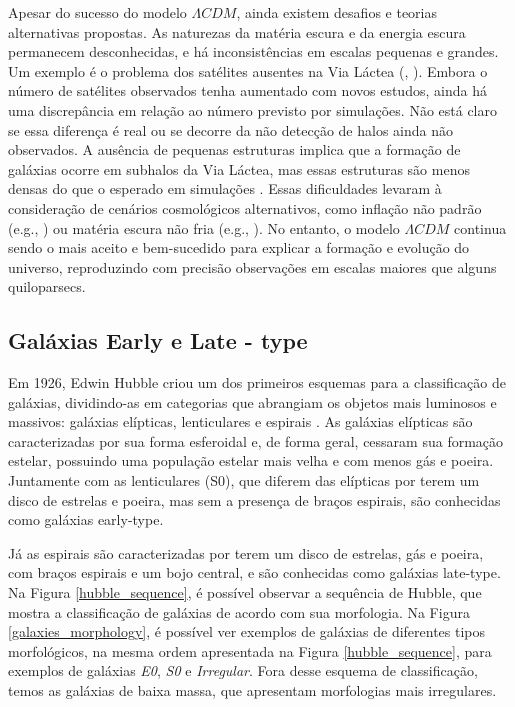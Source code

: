 Apesar do sucesso do modelo $\Lambda CDM$, ainda existem desafios e teorias alternativas propostas. As naturezas da matéria escura e da energia escura permanecem desconhecidas, e há inconsistências em escalas pequenas e grandes. Um exemplo é o problema dos satélites ausentes na Via Láctea (\citealp{Klypin_1999}, \citealp{Moore_1999}). Embora o número de satélites observados tenha aumentado com novos estudos, ainda há uma discrepância em relação ao número previsto por simulações. Não está claro se essa diferença é real ou se decorre da não detecção de halos ainda não observados. A ausência de pequenas estruturas implica que a formação de galáxias ocorre em subhalos da Via Láctea, mas essas estruturas são menos densas do que o esperado em simulações \citep{Boylan_Kolchin_2011}. Essas dificuldades levaram à consideração de cenários cosmológicos alternativos, como inflação não padrão (e.g., \citealp{Kamionkowski_2000}) ou matéria escura não fria (e.g., \citealp{Murgia_2017}). No entanto, o modelo $\Lambda CDM$ continua sendo o mais aceito e bem-sucedido para explicar a formação e evolução do universo, reproduzindo com precisão observações em escalas maiores que alguns quiloparsecs.

\subsection{Galáxias Early e Late - type}\label{subsec:Galaxia_early_late}
Em 1926, Edwin Hubble criou um dos primeiros esquemas para a classificação de galáxias, dividindo-as em categorias que abrangiam os objetos mais luminosos e massivos: galáxias elípticas, lenticulares e espirais \citep{hubble_classification_1926}. As galáxias elípticas são caracterizadas por sua forma esferoidal e, de forma geral, cessaram sua formação estelar, possuindo uma população estelar mais velha e com menos gás e poeira. Juntamente com as lenticulares (S0), que diferem das elípticas por terem um disco de estrelas e poeira, mas sem a presença de braços espirais, são conhecidas como galáxias early-type.

Já as espirais são caracterizadas por terem um disco de estrelas, gás e poeira, com braços espirais e um bojo central, e são conhecidas como galáxias late-type. Na Figura \ref{hubble_sequence}, é possível observar a sequência de Hubble, que mostra a classificação de galáxias de acordo com sua morfologia. Na Figura \ref{galaxies_morphology}, é possível ver exemplos de galáxias de diferentes tipos morfológicos, na mesma ordem apresentada na Figura \ref{hubble_sequence}, para exemplos de galáxias \textit{E0}, \textit{S0} e \textit{Irregular}. Fora desse esquema de classificação, temos as galáxias de baixa massa, que apresentam morfologias mais irregulares.

